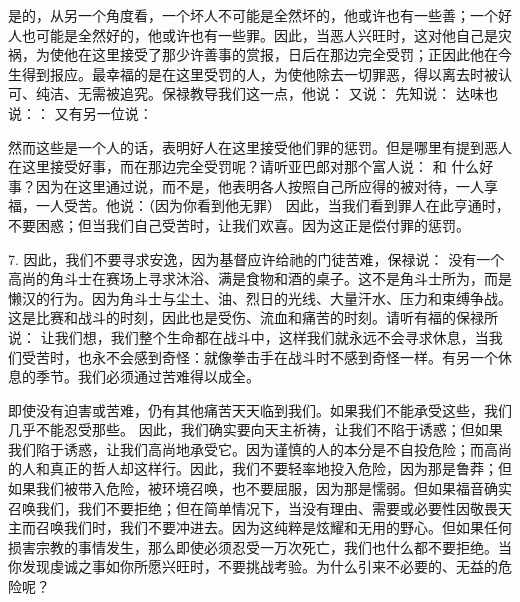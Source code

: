 是的，从另一个角度看，一个坏人不可能是全然坏的，他或许也有一些善；一个好人也可能是全然好的，他或许也有一些罪。因此，当恶人兴旺时，这对他自己是灾祸，为使他在这里接受了那少许善事的赏报，日后在那边完全受罚；正因此他在今生得到报应。最幸福的是在这里受罚的人，为使他除去一切罪恶，得以离去时被认可、纯洁、无需被追究。保禄教导我们这一点，他说：  又说：  先知说：  达味也说：：  又有另一位说： \par

然而这些是一个人的话，表明好人在这里接受他们罪的惩罚。但是哪里有提到恶人在这里接受好事，而在那边完全受罚呢？请听亚巴郎对那个富人说： 和   什么好事？因为在这里通过说，而不是，他表明各人按照自己所应得的被对待，一人享福，一人受苦。他说：（因为你看到他无罪） 因此，当我们看到罪人在此亨通时，不要困惑；但当我们自己受苦时，让我们欢喜。因为这正是偿付罪的惩罚。\par

7. 因此，我们不要寻求安逸，因为基督应许给祂的门徒苦难，保禄说：  没有一个高尚的角斗士在赛场上寻求沐浴、满是食物和酒的桌子。这不是角斗士所为，而是懒汉的行为。因为角斗士与尘土、油、烈日的光线、大量汗水、压力和束缚争战。这是比赛和战斗的时刻，因此也是受伤、流血和痛苦的时刻。请听有福的保禄所说：  让我们想，我们整个生命都在战斗中，这样我们就永远不会寻求休息，当我们受苦时，也永不会感到奇怪：就像拳击手在战斗时不感到奇怪一样。有另一个休息的季节。我们必须通过苦难得以成全。\par

即使没有迫害或苦难，仍有其他痛苦天天临到我们。如果我们不能承受这些，我们几乎不能忍受那些。   因此，我们确实要向天主祈祷，让我们不陷于诱惑；但如果我们陷于诱惑，让我们高尚地承受它。因为谨慎的人的本分是不自投危险；而高尚的人和真正的哲人却这样行。因此，我们不要轻率地投入危险，因为那是鲁莽；但如果我们被带入危险，被环境召唤，也不要屈服，因为那是懦弱。但如果福音确实召唤我们，我们不要拒绝；但在简单情况下，当没有理由、需要或必要性因敬畏天主而召唤我们时，我们不要冲进去。因为这纯粹是炫耀和无用的野心。但如果任何损害宗教的事情发生，那么即使必须忍受一万次死亡，我们也什么都不要拒绝。当你发现虔诚之事如你所愿兴旺时，不要挑战考验。为什么引来不必要的、无益的危险呢？\par

